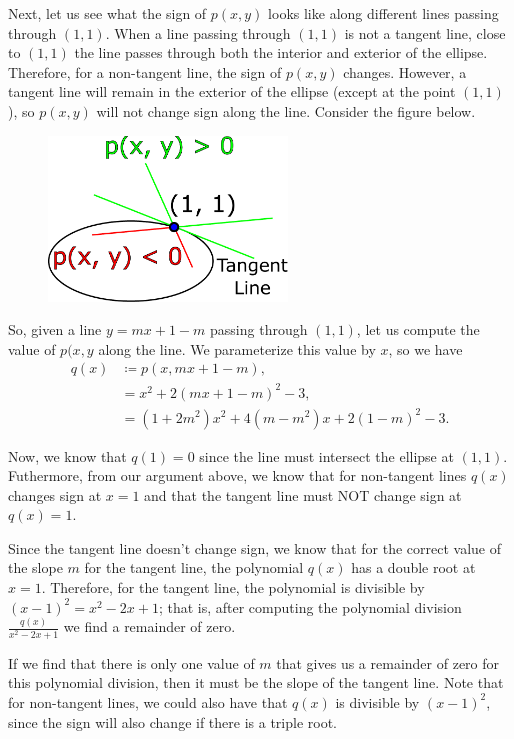 Next, let us see what the sign of \(p(x,y)\) looks like along different lines passing through \((1,1)\). 
When a line passing through \((1,1)\) is not a tangent line, close to \((1,1)\) the line passes through
both the interior and exterior of the ellipse. Therefore, for a non-tangent line, the sign of \(p(x,y)\)
changes. However, a tangent line will remain in the exterior of the ellipse (except at the point \((1,1)\)),
so \(p(x,y)\) will not change sign along the line. Consider the figure below.
\begin{figure}[h]
\centering
\includegraphics[width=2.5in]{preCalculus/signTangentLines.pdf}
\end{figure}  

So, given a line \(y = mx + 1 - m\) passing through \((1,1)\), let us compute the value of \(p(x,y\) along
the line. We parameterize this value by \(x\), so we have
\begin{align}
q(x) & \coloneqq p(x, mx + 1 - m), \\
    & = x^2 + 2(mx + 1 - m)^2 - 3, \\
    & = (1 + 2m^2)x^2 + 4(m - m^2) x + 2(1 - m)^2 - 3.
\end{align}

Now, we know that \(q(1) = 0\) since the line must intersect the ellipse at \((1,1)\). Futhermore, from our
argument above, we know that for non-tangent lines \(q(x)\) changes sign at \(x = 1\) and that the tangent
line must NOT change sign at \(q(x) = 1\).

Since the tangent line doesn't change sign, we know that for the correct value of the slope \(m\) for the
tangent line, the polynomial \(q(x)\) has a double root at \(x = 1\). Therefore, for the tangent line,
the polynomial is divisible by \((x - 1)^2 = x^2 - 2x + 1\); that is, after computing the polynomial division
\(\frac{q(x)}{x^2 - 2x + 1}\) we find a remainder of zero.

If we find that there is only one value of \(m\) that gives us a remainder of zero for this polynomial division,
then it must be the slope of the tangent line. Note that for non-tangent lines, we could also have that
\(q(x)\) is divisible by \((x - 1)^2\), since the sign will also change if there is a triple root.

